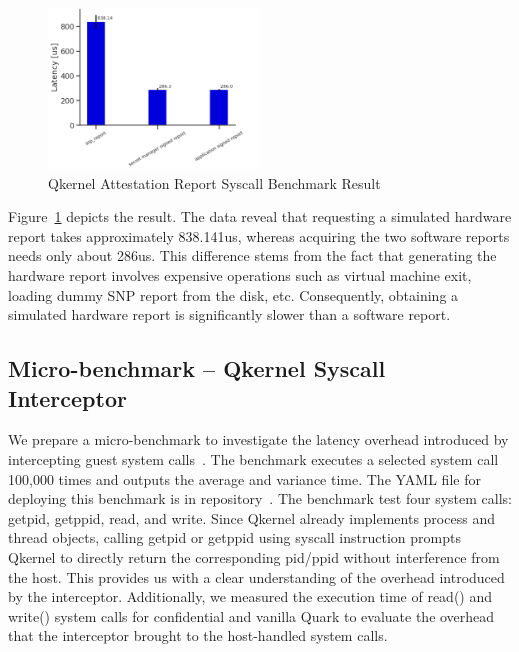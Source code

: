 \begin{figure}[!htb]
    \centering
    \includegraphics[width=0.5\textwidth]{images/perf_attestation_report_result.PNG}
    \caption[Benchmark result of Attestation Report Syscall]{Qkernel Attestation Report Syscall Benchmark Result}
    \label{fig:perf_attestation_report_result}
\end{figure}

Figure~\ref{fig:perf_attestation_report_result}  depicts the result. The data reveal that requesting a simulated hardware report takes approximately 838.141us, whereas acquiring the two software reports needs only about 286us. This difference stems from the fact that generating the hardware report involves expensive operations 
such as virtual machine exit, loading dummy SNP report from the disk, etc. Consequently, obtaining a simulated hardware report is significantly slower than a software report.


\subsection{Micro-benchmark – Qkernel Syscall Interceptor}\label{bench_Interceptor}

We prepare a micro-benchmark to investigate the latency overhead introduced by intercepting guest system calls~\cite*{benchamark_systemcall_intercetion}. The benchmark executes a selected system call 100,000 times and outputs the average and variance time. The YAML file for deploying this benchmark is 
in repository~\cite*{perf_test_repo}. The benchmark test four system calls: getpid, getppid, read, and write. Since Qkernel already implements process and thread objects, calling getpid or getppid using syscall instruction prompts Qkernel to directly return the corresponding pid/ppid without interference from the host. This provides us with a clear 
understanding of the overhead introduced by the interceptor. Additionally, we measured the execution time of read() and write() system calls for confidential and vanilla Quark to evaluate the overhead that the interceptor brought to the host-handled system calls.

